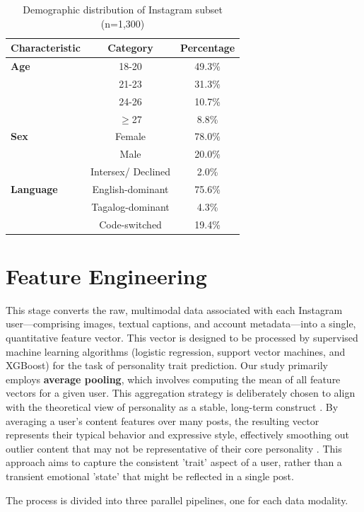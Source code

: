 \begin{table}[h]
	\centering
	\caption{Demographic distribution of Instagram subset (n=1,300)}
	\label{tab:demo}
	\begin{tabular}{lcc}
		\hline
		\textbf{Characteristic} & \textbf{Category} & \textbf{Percentage} \\ \hline
		\textbf{Age} & 18-20 & 49.3\% \\
		& 21-23 & 31.3\% \\
		& 24-26 & 10.7\% \\
		& $\geq$27 & 8.8\% \\ \hline
		\textbf{Sex} & Female & 78.0\% \\
		& Male & 20.0\% \\
		& Intersex/ Declined & 2.0\% \\ \hline
		\textbf{Language} & English-dominant & 75.6\% \\
		& Tagalog-dominant & 4.3\% \\
		& Code-switched & 19.4\% \\ \hline
	\end{tabular}
\end{table}
\section{Feature Engineering}
\label{subsec:features}
This stage converts the raw, multimodal data associated with each Instagram user—comprising images, textual captions, and account metadata—into a single, quantitative feature vector. This vector is designed to be processed by supervised machine learning algorithms (logistic regression, support vector machines, and XGBoost) for the task of personality trait prediction. Our study primarily employs \textbf{average pooling}, which involves computing the mean of all feature vectors for a given user. This aggregation strategy is deliberately chosen to align with the theoretical view of personality as a stable, long-term construct \citep{babcock2020big}. By averaging a user's content features over many posts, the resulting vector represents their typical behavior and expressive style, effectively smoothing out outlier content that may not be representative of their core personality \citep{azucar_predicting_2018}. This approach aims to capture the consistent 'trait' aspect of a user, rather than a transient emotional 'state' that might be reflected in a single post.


The process is divided into three parallel pipelines, one for each data modality.

